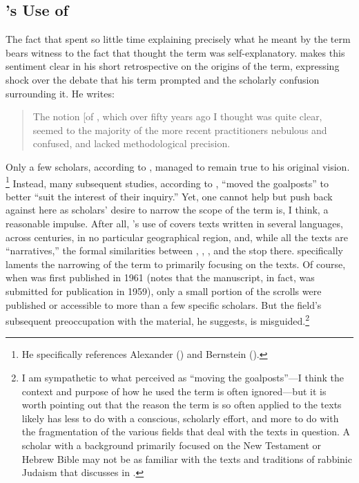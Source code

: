 \subsection{\vermes's Use of \RWB} 

The fact that \vermes spent so little time explaining precisely what he meant by the term \rwb bears witness to the fact that \vermes thought the term was self-explanatory. \vermes makes this sentiment clear in his short retrospective on the origins of the term, expressing shock over the debate that his term prompted and the scholarly confusion surrounding it. He writes: 

\begin{quote}
    The notion {[}of \rwb{]}, which over fifty years ago I thought was quite clear, seemed to the majority of the more recent practitioners nebulous and confused, and lacked methodological precision.\autocite[3]{vermes_zsengeller2014}
\end{quote} 
\noindent
%
Only a few scholars, according to \vermes, managed to remain true to his original vision.%
%
\footnote{He specifically references   Alexander (\autocite*{alexander_carson-williamson1988}) and Bernstein   (\autocite*{bernstein_textus2005}).}
%
Instead, many subsequent studies, according to \vermes, ``moved the goalposts'' to better ``suit the interest of their inquiry.''\autocite[4]{vermes_zsengeller2014} Yet, one cannot help but push back against \vermes here as scholars' desire to narrow the scope of the term is, I think, a reasonable impulse. After all, \vermes's use of \rwb covers texts written in several languages, across centuries, in no particular geographical region, and, while all the texts are ``narratives,'' the formal similarities between \ga, \ant, \jub, and the \pTarg stop there. \vermes specifically laments the narrowing of the term \rwb to primarily focusing on the \dss texts. Of course, when  was first published in 1961 (\vermes notes that the manuscript, in fact, was submitted for publication in 1959), only a small portion of the scrolls were published or accessible to more than a few specific scholars. But the field's subsequent preoccupation with the \qumran material, he suggests, is misguided.\footnote{I am sympathetic to what \vermes perceived as ``moving the goalposts''---I think the context and purpose of how he used the term \rwb is often ignored---but it is worth pointing out that the reason the term \rwb is so often applied to the \qumran texts likely has less to do with a conscious, scholarly effort, and more to do with the fragmentation of the various fields that deal with the texts in question. A scholar with a background primarily focused on the New Testament or Hebrew Bible may not be as familiar with the texts and traditions of rabbinic Judaism that \vermes discusses in   .} 


